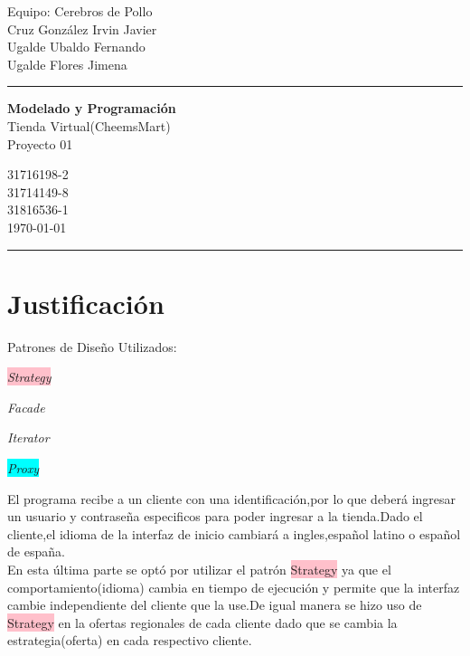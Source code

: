\documentclass[a4paper,12pt]{article}
\begin{document}
\fancyhead[C]{}
\begin{minipage}{0.295\textwidth} 
\raggedright
Equipo: Cerebros de Pollo\\    
\footnotesize 
\colorbox[rgb]{0.67, 0.88, 0.69}{Cruz González Irvin Javier}
\\\colorbox[rgb]{0.06, 0.75, 0.99 }{Ugalde Ubaldo Fernando}
\\\colorbox[rgb]{0.96, 0.76, 0.76}{Ugalde Flores Jimena}

\textcolor[rgb]{0.0, 0.72, 0.92}{\medskip\hrule}
\end{minipage}
\begin{minipage}{0.4\textwidth} 
\centering 
\large 
\textbf{Modelado y Programación}\\ 
\normalsize 
Tienda Virtual(CheemsMart) \\Proyecto 01\\
\end{minipage}
\begin{minipage}{0.295\textwidth} 
\raggedleft
\footnotesize
\colorbox[rgb]{0.67, 0.88, 0.69}{31716198-2}\\
\colorbox[rgb]{0.06, 0.75, 0.99 }{31714149-8}\\
\colorbox[rgb]{0.96, 0.76, 0.76}{31816536-1}\\
\today
\textcolor[rgb]{0.0, 0.72, 0.92}{\medskip\hrule}
\end{minipage}


\section*{Justificación}
Patrones de Diseño Utilizados:

   \begin{multicols}{4}
     \colorbox{pink}{\textit{Strategy}}

     \colorbox{brightube}{\textit{Facade}}

     \colorbox{applegreen}{\textit{Iterator}}

     \colorbox{cyan}{\textit{Proxy}}
   \end{multicols} 

   El programa recibe a un cliente con una identificación,por lo que deberá ingresar un usuario y contraseña especificos para poder ingresar 
   a la tienda.Dado el cliente,el idioma de la interfaz de inicio cambiará a ingles,español latino o español de españa.\\
   En esta última parte se optó por utilizar el patrón \colorbox{pink}{Strategy} ya que el comportamiento(idioma) cambia en tiempo de ejecución
   y permite que la interfaz cambie independiente del cliente que la use.De igual manera se hizo uso de \colorbox{pink}{Strategy} en la ofertas regionales de cada cliente dado que se cambia la estrategia(oferta) en cada respectivo 
   cliente.\\
\end{document}

